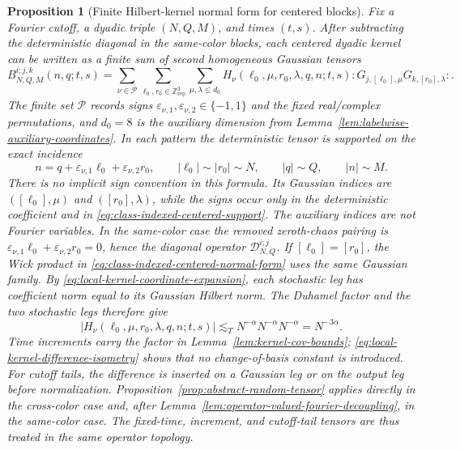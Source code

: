 \documentclass[10pt]{amsart}
\numberwithin{equation}{section}
\theoremstyle{plain}
\newtheorem{proposition}[theorem]{Proposition}
\theoremstyle{definition}
\theoremstyle{remark}
\begin{document}
\begin{proposition}[Finite Hilbert-kernel normal form for centered blocks]\label{prop:finite-hilbert-kernel-normal-form}
Fix a Fourier cutoff, a dyadic triple $(N,Q,M)$, and times $(t,s)$.  After subtracting the deterministic diagonal in the same-color blocks, each centered dyadic kernel can be written as a finite sum of second homogeneous Gaussian tensors
\begin{equation}\label{eq:class-indexed-centered-normal-form}
        B_{N,Q,M}^{i;j,k}(n,q;t,s)
        =\sum_{\nu\in\mathcal P}
        \sum_{\ell_0,r_0\in\mathbb Z^3_{\mathrm{rep}}}
        \sum_{\mu,\lambda\le d_0}
        H_\nu(\ell_0,\mu,r_0,\lambda,q,n;t,s)
        :G_{j,[\ell_0],\mu}G_{k,[r_0],\lambda}:.
\end{equation}
The finite set $\mathcal P$ records signs
$\varepsilon_{\nu,1},\varepsilon_{\nu,2}\in\{-1,1\}$ and the fixed
real/complex permutations, and $d_0=8$ is the auxiliary dimension from
Lemma~\ref{lem:labelwise-auxiliary-coordinates}.  In each pattern the
deterministic tensor is supported on the exact incidence
\begin{equation}\label{eq:class-indexed-centered-support}
        n=q+\varepsilon_{\nu,1}\ell_0
            +\varepsilon_{\nu,2}r_0,
        \qquad |\ell_0|\sim |r_0|\sim N,
        \qquad |q|\sim Q,
        \qquad |n|\sim M.
\end{equation}
There is no implicit sign convention in this formula.  Its Gaussian indices
are $([\ell_0],\mu)$ and $([r_0],\lambda)$, while the signs occur only in the
deterministic coefficient and in \eqref{eq:class-indexed-centered-support}.
The auxiliary indices are not Fourier variables.  In the same-color case the
removed zeroth-chaos pairing is
$\varepsilon_{\nu,1}\ell_0+\varepsilon_{\nu,2}r_0=0$, hence the diagonal
operator $\mathcal D_{N,Q}^{i;j}$.  If $[\ell_0]=[r_0]$, the Wick product in
\eqref{eq:class-indexed-centered-normal-form} uses the same Gaussian family.
By \eqref{eq:local-kernel-coordinate-expansion}, each stochastic leg has
coefficient norm equal to its Gaussian Hilbert norm.  The Duhamel factor and
the two stochastic legs therefore give
\[
        |H_\nu(\ell_0,\mu,r_0,\lambda,q,n;t,s)|
        \lesssim_T N^{-\alpha}N^{-\alpha}N^{-\alpha}
        =N^{-3\alpha}.
\]
Time increments carry the factor in Lemma~\ref{lem:kernel-cov-bounds};
\eqref{eq:local-kernel-difference-isometry} shows that no change-of-basis
constant is introduced.  For cutoff tails, the difference is inserted on a
Gaussian leg or on the output leg before normalization.  Proposition~\ref{prop:abstract-random-tensor} applies directly in the cross-color case and, after Lemma~\ref{lem:operator-valued-fourier-decoupling}, in the same-color case.  The fixed-time, increment, and cutoff-tail tensors are thus treated in the same operator topology.
\end{proposition}
\end{document}
